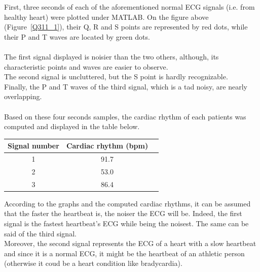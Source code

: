 \documentclass[11pt]{report}
\begin{document}
		First, three seconds of each of the aforementioned normal ECG signals (i.e. from healthy heart) were plotted under MATLAB. On the figure above (Figure~\ref{Q311_1}), their Q, R and S points are represented by red dots, while their P and T waves are located by green dots.  \\
		\\
		The first signal displayed is noisier than the two others, although, its characteristic points and waves are easier to observe.\\
		The second signal is uncluttered, but the S point is hardly recognizable.\\
		Finally, the P and T waves of the third signal, which is a tad noisy, are nearly overlapping.\\
		\\
		Based on these four seconds samples, the cardiac rhythm of each patients was computed and displayed in the table below.\\
		\begin{center}
			\begin{tabular}{|c|c|c|}
				\hline
				\textbf{Signal number} & \textbf{Cardiac rhythm (bpm)} \\
				\hline
				1 & 91.7 \\ 
				\hline
				2 & 53.0 \\
				\hline
				3 & 86.4 \\
				\hline
			\end{tabular}
		\end{center}
		According to the graphs and the computed cardiac rhythms, it can be assumed that the faster the heartbeat is, the noiser the ECG will be. Indeed, the first signal is the fastest heartbeat's ECG while being the noisest. The same can be said of the third signal.\\
		Moreover, the second signal represents the ECG of a heart with a slow heartbeat and since it is a normal ECG, it might be the heartbeat of an athletic person (otherwise it coud be a heart condition like bradycardia).\\
		\\
\end{document}

